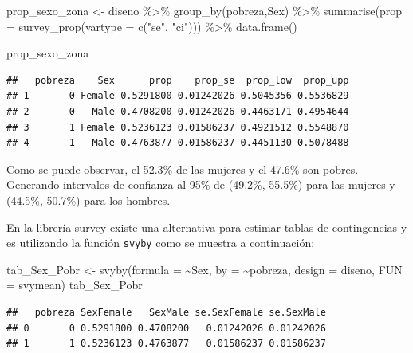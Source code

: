 \documentclass[
  12pt,
]{book}
\newenvironment{Shaded}{\begin{snugshade}}{\end{snugshade}}
\newcommand{\AttributeTok}[1]{\textcolor[rgb]{0.77,0.63,0.00}{#1}}
\newcommand{\FunctionTok}[1]{\textcolor[rgb]{0.00,0.00,0.00}{#1}}
\newcommand{\NormalTok}[1]{#1}
\newcommand{\OtherTok}[1]{\textcolor[rgb]{0.56,0.35,0.01}{#1}}
\newcommand{\SpecialCharTok}[1]{\textcolor[rgb]{0.00,0.00,0.00}{#1}}
\newcommand{\StringTok}[1]{\textcolor[rgb]{0.31,0.60,0.02}{#1}}
\begin{document}
\begin{Shaded}
\begin{Highlighting}[]
\NormalTok{prop\_sexo\_zona }\OtherTok{\textless{}{-}}\NormalTok{ diseno }\SpecialCharTok{\%\textgreater{}\%} 
                  \FunctionTok{group\_by}\NormalTok{(pobreza,Sex) }\SpecialCharTok{\%\textgreater{}\%}
                  \FunctionTok{summarise}\NormalTok{(}\AttributeTok{prop =} \FunctionTok{survey\_prop}\NormalTok{(}\AttributeTok{vartype =} \FunctionTok{c}\NormalTok{(}\StringTok{"se"}\NormalTok{, }\StringTok{"ci"}\NormalTok{))) }\SpecialCharTok{\%\textgreater{}\%} 
                  \FunctionTok{data.frame}\NormalTok{()}

\NormalTok{prop\_sexo\_zona}
\end{Highlighting}
\end{Shaded}

\begin{verbatim}
##   pobreza    Sex      prop    prop_se  prop_low  prop_upp
## 1       0 Female 0.5291800 0.01242026 0.5045356 0.5536829
## 2       0   Male 0.4708200 0.01242026 0.4463171 0.4954644
## 3       1 Female 0.5236123 0.01586237 0.4921512 0.5548870
## 4       1   Male 0.4763877 0.01586237 0.4451130 0.5078488
\end{verbatim}

Como se puede observar, el 52.3\% de las mujeres y el 47.6\% son pobres. Generando intervalos de confianza al 95\% de (49.2\%, 55.5\%) para las mujeres y (44.5\%, 50.7\%) para los hombres.

En la librería survey existe una alternativa para estimar tablas de contingencias y es utilizando la función \texttt{svyby} como se muestra a continuación:

\begin{Shaded}
\begin{Highlighting}[]
\NormalTok{tab\_Sex\_Pobr }\OtherTok{\textless{}{-}} \FunctionTok{svyby}\NormalTok{(}\AttributeTok{formula =} \SpecialCharTok{\textasciitilde{}}\NormalTok{Sex, }\AttributeTok{by =}  \SpecialCharTok{\textasciitilde{}}\NormalTok{pobreza, }\AttributeTok{design =}\NormalTok{ diseno, }\AttributeTok{FUN =}\NormalTok{ svymean)}
\NormalTok{tab\_Sex\_Pobr}
\end{Highlighting}
\end{Shaded}

\begin{verbatim}
##   pobreza SexFemale   SexMale se.SexFemale se.SexMale
## 0       0 0.5291800 0.4708200   0.01242026 0.01242026
## 1       1 0.5236123 0.4763877   0.01586237 0.01586237
\end{verbatim}
\end{document}
